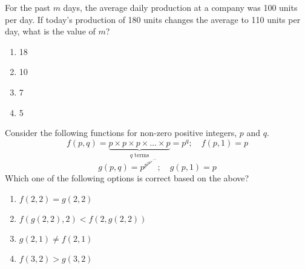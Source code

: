     \item {
    	For the past $m$ days, the average daily production at a company was 100 units
    	per day.
    	If today’s production of 180 units changes the average to 110 units per day,
    	what is the value of $m$? 
    	
    	
    	\begin{multicols}{4}
    		\begin{enumerate}
    			\item 18
    			\item 10 
    			\item 7
    			\item 5
    		\end{enumerate}
    	\end{multicols}
    
	}
    \item{
            Consider the following functions for non-zero positive integers, \(p\) and \(q\).
            \[
            f(p, q) = \underbrace{p \times p \times p \times \dots \times p}_{q \text{ terms}} = p^q; \quad f(p, 1) = p
            \]
            \[
            g(p, q) = p^{p^{p^{p^{p^{.^{.^{.^{\text{Upto q terms}}}}}}}}}; \quad g(p, 1) = p
            \]
            Which one of the following options is correct based on the above?
            
            
                
            \begin{multicols}{2}
                \begin{enumerate}
                	\item \(f(2,2) = g(2,2)\) \\
                	\item \(f(g(2,2), 2) < f(2, g(2,2))\) \\
                	\item \(g(2,1) \ne f(2,1)\) \\
                	\item \(f(3,2) > g(3,2)\)
                \end{enumerate}
            \end{multicols}

        
        }
